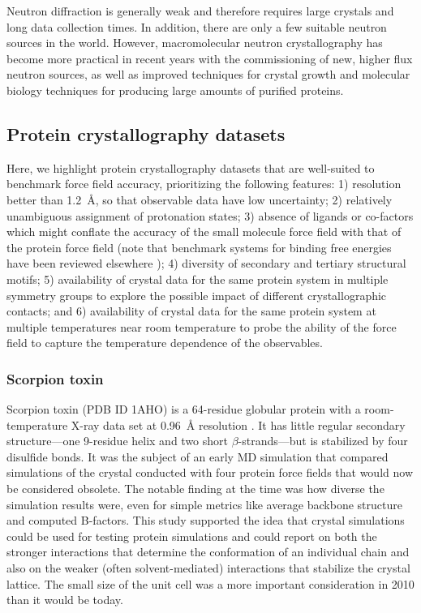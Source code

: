 \documentclass[9pt,review,pubversion]{livecoms}
\begin{document}
Neutron diffraction is generally weak and therefore requires large crystals and long data collection times.
In addition, there are only a few suitable neutron sources in the world.
However, macromolecular neutron crystallography has become more practical in recent years with the commissioning of new, higher flux neutron sources, as well as improved techniques for crystal growth and molecular biology techniques for producing large amounts of purified proteins.

\subsection{Protein crystallography datasets}
\label{sub:xtal_data}

Here, we highlight protein crystallography datasets that are well-suited to benchmark force field accuracy, prioritizing the following features: 1) resolution better than \qty{1.2}{\angstrom}, so that observable data have low uncertainty; 2) relatively unambiguous assignment of protonation states; 3) absence of ligands or co-factors which might conflate the accuracy of the small molecule force field with that of the protein force field (note that benchmark systems for binding free energies have been reviewed elsewhere \cite{mobley_predicting_2017,mobley_predicting_2017-1}); 4) diversity of secondary and tertiary structural motifs; 5) availability of crystal data for the same protein system in multiple symmetry groups to explore the possible impact of different crystallographic contacts; and 6) availability of crystal data for the same protein system at multiple temperatures near room temperature to probe the ability of the force field to capture the temperature dependence of the observables.

\subsubsection{Scorpion toxin}
\label{sub2:scorption_toxin}

Scorpion toxin (PDB ID 1AHO) is a 64-residue globular protein with a room-temperature X-ray data set at \qty{0.96}{\angstrom} resolution \cite{smith_ab_1997}.
It has little regular secondary structure---one 9-residue helix and two short $\beta$-strands---but is stabilized by four disulfide bonds.
It was the subject of an early MD simulation \cite{cerutti_simulations_2010} that compared simulations of the crystal conducted with four protein force fields that would now be considered obsolete.
The notable finding at the time was how diverse the simulation results were, even for simple metrics like average backbone structure and computed B-factors.
This study supported the idea that crystal simulations could be used for testing protein simulations and could report on both the stronger interactions that determine the conformation of an individual chain and also on the weaker (often solvent-mediated) interactions that stabilize the crystal lattice.
The small size of the unit cell was a more important consideration in 2010 than it would be today.
\end{document}
